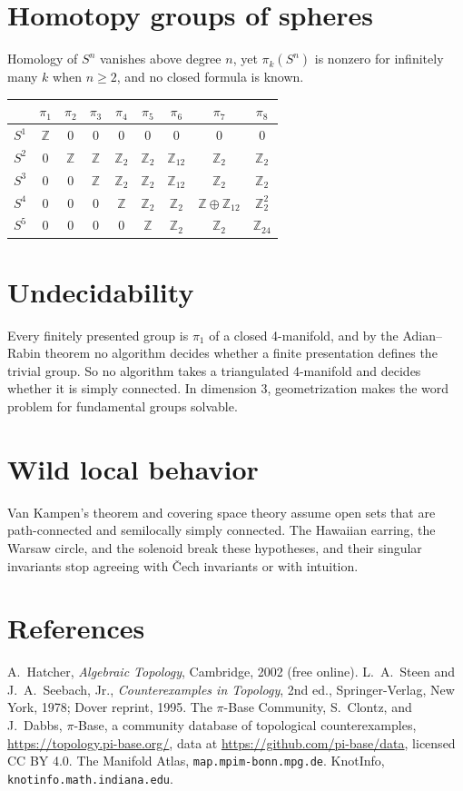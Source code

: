 \documentclass[11pt,twoside]{book}
\begin{document}
\section{Homotopy groups of spheres}
Homology of $S^n$ vanishes above degree $n$, yet $\pi_k(S^n)$ is nonzero for infinitely many $k$ when $n\ge2$, and no closed formula is known.
\begin{center}\renewcommand{\arraystretch}{1.2}
\begin{tabular}{c|cccccccc}
 & $\pi_1$ & $\pi_2$ & $\pi_3$ & $\pi_4$ & $\pi_5$ & $\pi_6$ & $\pi_7$ & $\pi_8$\\\hline
$S^1$ & $\mathbb{Z}$ & $0$ & $0$ & $0$ & $0$ & $0$ & $0$ & $0$\\
$S^2$ & $0$ & $\mathbb{Z}$ & $\mathbb{Z}$ & $\mathbb{Z}_2$ & $\mathbb{Z}_2$ & $\mathbb{Z}_{12}$ & $\mathbb{Z}_2$ & $\mathbb{Z}_2$\\
$S^3$ & $0$ & $0$ & $\mathbb{Z}$ & $\mathbb{Z}_2$ & $\mathbb{Z}_2$ & $\mathbb{Z}_{12}$ & $\mathbb{Z}_2$ & $\mathbb{Z}_2$\\
$S^4$ & $0$ & $0$ & $0$ & $\mathbb{Z}$ & $\mathbb{Z}_2$ & $\mathbb{Z}_2$ & $\mathbb{Z}\oplus\mathbb{Z}_{12}$ & $\mathbb{Z}_2^2$\\
$S^5$ & $0$ & $0$ & $0$ & $0$ & $\mathbb{Z}$ & $\mathbb{Z}_2$ & $\mathbb{Z}_2$ & $\mathbb{Z}_{24}$
\end{tabular}\end{center}
\section{Undecidability}
Every finitely presented group is $\pi_1$ of a closed 4-manifold, and by the Adian--Rabin theorem no algorithm decides whether a finite presentation defines the trivial group. So no algorithm takes a triangulated 4-manifold and decides whether it is simply connected. In dimension 3, geometrization makes the word problem for fundamental groups solvable.
\section{Wild local behavior}
Van Kampen's theorem and covering space theory assume open sets that are path-connected and semilocally simply connected. The Hawaiian earring, the Warsaw circle, and the solenoid break these hypotheses, and their singular invariants stop agreeing with \v{C}ech invariants or with intuition.
\section{References}
A.~Hatcher, \emph{Algebraic Topology}, Cambridge, 2002 (free online). L.~A.~Steen and J.~A.~Seebach, Jr., \emph{Counterexamples in Topology}, 2nd ed., Springer-Verlag, New York, 1978; Dover reprint, 1995. The $\pi$-Base Community, S.~Clontz, and J.~Dabbs, $\pi$-Base, a community database of topological counterexamples, \url{https://topology.pi-base.org/}, data at \url{https://github.com/pi-base/data}, licensed CC BY 4.0. The Manifold Atlas, \texttt{map.mpim-bonn.mpg.de}. KnotInfo, \texttt{knotinfo.math.indiana.edu}.
\end{document}
